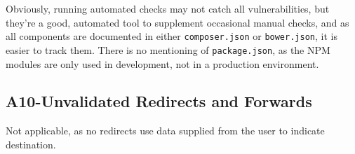 Obviously, running automated checks may not catch all vulnerabilities,
but they're a good, automated tool to supplement occasional manual
checks, and as all components are documented in either
\texttt{composer.json} or \texttt{bower.json}, it is easier to track
them. There is no mentioning of \texttt{package.json}, as the NPM
modules are only used in development, not in a production environment.

\subsection{A10-Unvalidated Redirects and Forwards}

Not applicable, as no redirects use data supplied from the user to
indicate destination.


